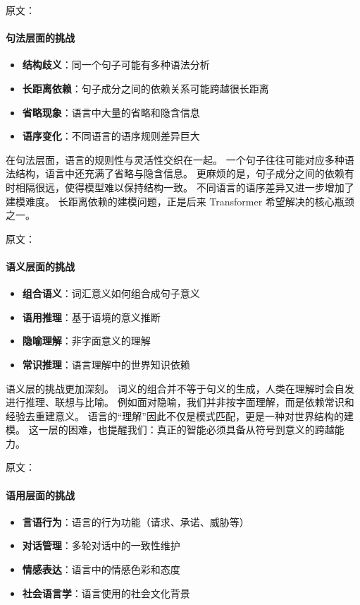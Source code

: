 原文：
\paragraph{句法层面的挑战}
\begin{itemize}
\item \textbf{结构歧义}：同一个句子可能有多种语法分析
\item \textbf{长距离依赖}：句子成分之间的依赖关系可能跨越很长距离
\item \textbf{省略现象}：语言中大量的省略和隐含信息
\item \textbf{语序变化}：不同语言的语序规则差异巨大
\end{itemize}

在句法层面，语言的规则性与灵活性交织在一起。  
一个句子往往可能对应多种语法结构，语言中还充满了省略与隐含信息。  
更麻烦的是，句子成分之间的依赖有时相隔很远，使得模型难以保持结构一致。  
不同语言的语序差异又进一步增加了建模难度。  
长距离依赖的建模问题，正是后来 Transformer 希望解决的核心瓶颈之一。  



原文：
\paragraph{语义层面的挑战}
\begin{itemize}
\item \textbf{组合语义}：词汇意义如何组合成句子意义
\item \textbf{语用推理}：基于语境的意义推断
\item \textbf{隐喻理解}：非字面意义的理解
\item \textbf{常识推理}：语言理解中的世界知识依赖
\end{itemize}

语义层的挑战更加深刻。  
词义的组合并不等于句义的生成，人类在理解时会自发进行推理、联想与比喻。  
例如面对隐喻，我们并非按字面理解，而是依赖常识和经验去重建意义。  
语言的“理解”因此不仅是模式匹配，更是一种对世界结构的建模。  
这一层的困难，也提醒我们：真正的智能必须具备从符号到意义的跨越能力。  



原文：
\paragraph{语用层面的挑战}
\begin{itemize}
\item \textbf{言语行为}：语言的行为功能（请求、承诺、威胁等）
\item \textbf{对话管理}：多轮对话中的一致性维护
\item \textbf{情感表达}：语言中的情感色彩和态度
\item \textbf{社会语言学}：语言使用的社会文化背景
\end{itemize}

